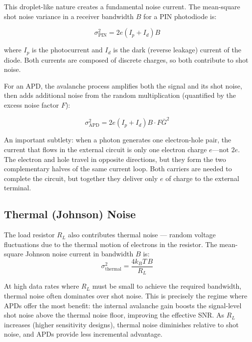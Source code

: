 This droplet-like nature creates a fundamental noise current. The mean-square shot noise variance in a receiver bandwidth $B$ for a PIN photodiode is:
\begin{keyresult}
    \begin{equation}
        \sigma_\text{PIN}^2 = 2e(I_p + I_d)B
    \end{equation}
\end{keyresult}
where $I_p$ is the photocurrent and $I_d$ is the dark (reverse leakage) current of the diode. Both currents are composed of discrete charges, so both contribute to shot noise.

For an APD, the avalanche process amplifies both the signal and its shot noise, then adds additional noise from the random multiplication (quantified by the excess noise factor $F$):
\begin{keyresult}
    \begin{equation}
        \sigma_\text{APD}^2 = 2e(I_p + I_d)B \cdot F\bar{G}^2
    \end{equation}
\end{keyresult}

An important subtlety: when a photon generates one electron-hole pair, the current that flows in the external circuit is only one electron charge $e$—not $2e$. The electron and hole travel in opposite directions, but they form the two complementary halves of the same current loop. Both carriers are needed to complete the circuit, but together they deliver only $e$ of charge to the external terminal.

\subsection{Thermal (Johnson) Noise}

The load resistor $R_L$ also contributes thermal noise — random voltage fluctuations due to the thermal motion of electrons in the resistor. The mean-square Johnson noise current in bandwidth $B$ is:
\begin{equation*}
    \sigma_\text{thermal}^2 = \frac{4k_BT\,B}{R_L}
\end{equation*}

At high data rates where $R_L$ must be small to achieve the required bandwidth, thermal noise often dominates over shot noise. This is precisely the regime where APDs offer the most benefit: the internal avalanche gain boosts the signal-level shot noise above the thermal noise floor, improving the effective SNR. As $R_L$ increases (higher sensitivity designs), thermal noise diminishes relative to shot noise, and APDs provide less incremental advantage.

